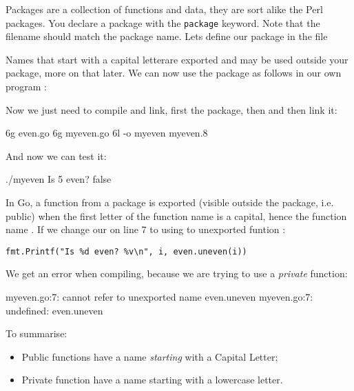 \noindent{}Packages are a collection of functions and data, they are sort alike the
Perl packages\cite{perl-packages}. You declare a package with the
\lstinline{package} keyword. Note that the filename should
match the package name. Lets define our package  in the file


Names that start with a capital letterare exported and may be used
outside your package, more on that later. We can now use
the package as follows in our own program :


Now we just need to compile and link, first the package, then  and
then link it:
\begin{display}
\pr 6g even.go			\qquad\qquad{}
\pr 6g myeven.go		\qquad\qquad{}
\pr 6l -o myeven myeven.8
\end{display}
And now we can test it:
\begin{display}
\pr ./myeven
Is 5 even? false
\end{display}

In Go, a function from a package is exported (visible
outside the package, i.e. public) when the first letter of the function name is a capital, hence
the function name . If we change our  on line
7 to using to unexported funtion :

\noindent\lstinline{fmt.Printf("Is %d even? %v\n", i, even.uneven(i))}

We get an error when compiling, because we are trying to use a
\emph{private} function:
\begin{display}
myeven.go:7: cannot refer to unexported name even.uneven
myeven.go:7: undefined: even.uneven
\end{display}
To summarise:
\begin{itemize}
\item Public functions have a name \emph{starting} with a Capital
Letter;
\item Private function have a name starting with a lowercase letter.
\end{itemize}


